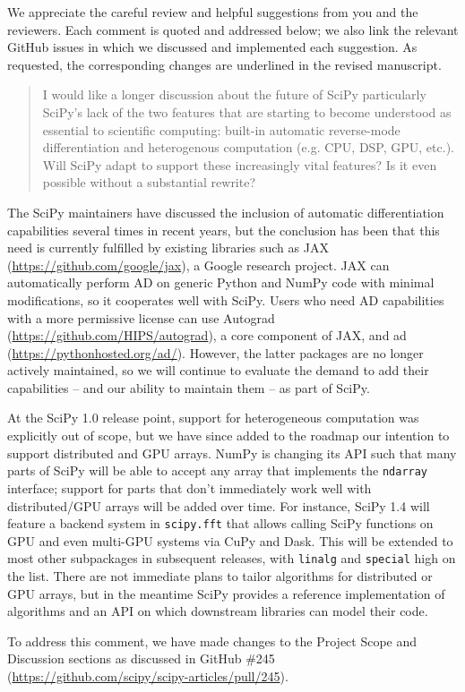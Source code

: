 \documentclass[10pt,stdletter,dateno]{newlfm}
\begin{document}
\begin{newlfm}

We appreciate the careful review and helpful suggestions from you and the reviewers. Each comment is quoted and addressed below; we also link the relevant GitHub issues in which we discussed and implemented each suggestion. As requested, the corresponding changes are underlined in the revised manuscript.

\begin{quote}
I would like a longer discussion about the future of SciPy particularly SciPy’s lack of the two features that are starting to become understood as essential to scientific computing: built-in automatic reverse-mode differentiation and heterogenous computation (e.g. CPU, DSP, GPU, etc.). Will SciPy adapt to support these increasingly vital features? Is it even possible without a substantial rewrite?
\end{quote}

The SciPy maintainers have discussed the inclusion of automatic differentiation capabilities several times in recent years, but the conclusion has been that this need is currently fulfilled by existing libraries such as JAX (\url{https://github.com/google/jax}), a Google research project. JAX can automatically perform AD on generic Python and NumPy code with minimal modifications, so it cooperates well with SciPy. Users who need AD capabilities with a more permissive license can use Autograd (\url{https://github.com/HIPS/autograd}), a core component of JAX, and ad (\url{https://pythonhosted.org/ad/}). However, the latter packages are no longer actively maintained, so we will continue to evaluate the demand to add their capabilities -- and our ability to maintain them -- as part of SciPy.

At the SciPy 1.0 release point, support for heterogeneous computation was explicitly out of scope, but we have since added to the roadmap our intention to support distributed and GPU arrays. NumPy is changing its API such that many parts of SciPy will be able to accept any array that implements the \texttt{ndarray} interface; support for parts that don't immediately work well with distributed/GPU arrays will be added over time. For instance, SciPy 1.4 will feature a backend system in \texttt{scipy.fft} that allows calling SciPy functions on GPU and even multi-GPU systems via CuPy and Dask. This will be extended to most other subpackages in subsequent releases, with \texttt{linalg} and \texttt{special} high on the list. There are not immediate plans to tailor algorithms for distributed or GPU arrays, but in the meantime SciPy provides a reference implementation of algorithms and an API on which downstream libraries can model their code.

To address this comment, we have made changes to the Project Scope and Discussion sections as discussed in GitHub \#245 (\url{https://github.com/scipy/scipy-articles/pull/245}).







\end{newlfm}
\end{document}
